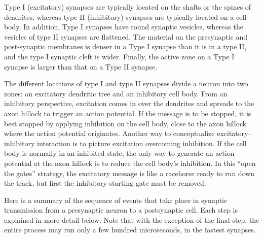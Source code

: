 Type I (excitatory) synapses are typically located on the shafts or the spines of dendrites, whereas type II (inhibitory) synapses are typically located on a cell body. In addition, Type I synapses have round synaptic vesicles, whereas the vesicles of type II synapses are flattened. The material on the presynaptic and post-synaptic membranes is denser in a Type I synapse than it is in a type II, and the type I synaptic cleft is wider. Finally, the active zone on a Type I synapse is larger than that on a Type II synapse.

The different locations of type I and type II synapses divide a neuron into two zones: an excitatory dendritic tree and an inhibitory cell body. From an inhibitory perspective, excitation comes in over the dendrites and spreads to the axon hillock to trigger an action potential. If the message is to be stopped, it is best stopped by applying inhibition on the cell body, close to the axon hillock where the action potential originates. Another way to conceptualize excitatory--inhibitory interaction is to picture excitation overcoming inhibition. If the cell body is normally in an inhibited state, the only way to generate an action potential at the axon hillock is to reduce the cell body's inhibition. In this ``open the gates'' strategy, the excitatory message is like a racehorse ready to run down the track, but first the inhibitory starting gate must be removed.

Here is a summary of the sequence of events that take place in synaptic transmission from a presynaptic neuron to a postsynaptic cell. Each step is explained in more detail below. Note that with the exception of the final step, the entire process may run only a few hundred microseconds, in the fastest synapses.

